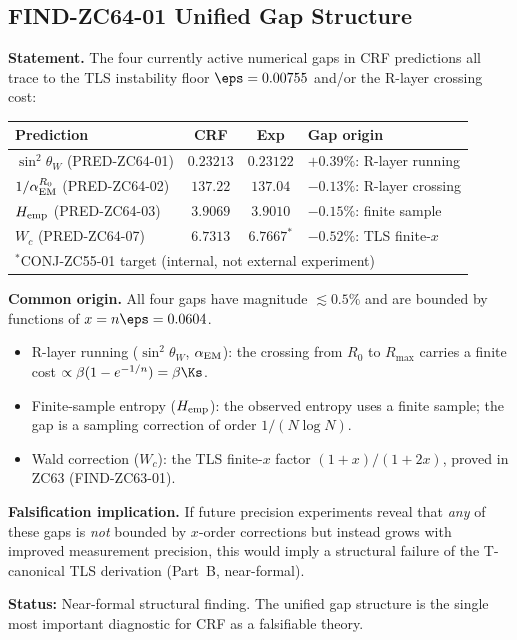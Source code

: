 \documentclass[12pt, a4paper]{article}
\renewcommand{\swsq}{\sin^2\!\theta_W}
\renewcommand{\aEM}{\alpha_{\rm EM}}
\begin{document}
\subsection{FIND-ZC64-01 \quad Unified Gap Structure}
\label{sec:find01}


\begin{derivedbox}[title={FIND-ZC64-01: All Active Gaps Share
  a Common Origin in $\eps$ ($R_0$)}]
\textbf{Statement.}
The four currently active numerical gaps in CRF predictions
all trace to the TLS instability floor $\eps = 0.00755$
and/or the R-layer crossing cost:

\medskip
\begin{center}
{\small\renewcommand{\arraystretch}{1.30}
\begin{tabular}{@{}lccl@{}}
\toprule
Prediction & CRF & Exp & Gap origin \\
\midrule
$\swsq$ (PRED-ZC64-01) & $0.23213$ & $0.23122$ & $+0.39\%$: R-layer running \\
$1/\aEM^{R_0}$ (PRED-ZC64-02) & $137.22$ & $137.04$ & $-0.13\%$: R-layer crossing \\
$H_{\rm emp}$ (PRED-ZC64-03) & $3.9069$ & $3.9010$ & $-0.15\%$: finite sample \\
$W_c$ (PRED-ZC64-07) & $6.7313$ & $6.7667^*$ & $-0.52\%$: TLS finite-$x$ \\
\bottomrule
\multicolumn{4}{l}{${}^*$CONJ-ZC55-01 target (internal, not external experiment)}
\end{tabular}
}
\end{center}

\medskip
\textbf{Common origin.}
All four gaps have magnitude $\lesssim 0.5\%$ and are bounded
by functions of $x = n\eps = 0.0604$.
\begin{itemize}[leftmargin=2em, noitemsep]
  \item R-layer running ($\swsq$, $\aEM$): the crossing
    from $R_0$ to $R_{\max}$ carries a finite cost
    $\propto \beta(1-e^{-1/n}) = \beta\Ks$.
  \item Finite-sample entropy ($H_{\rm emp}$): the observed
    entropy uses a finite sample; the gap is a sampling
    correction of order $1/(N\log N)$.
  \item Wald correction ($W_c$): the TLS finite-$x$ factor
    $(1+x)/(1+2x)$, proved in ZC63 (FIND-ZC63-01).
\end{itemize}

\textbf{Falsification implication.}
If future precision experiments reveal that \emph{any} of
these gaps is \emph{not} bounded by $x$-order corrections
but instead grows with improved measurement precision,
this would imply a structural failure of the T-canonical
TLS derivation (Part~B, near-formal).

\textbf{Status:} Near-formal structural finding.
The unified gap structure is the single most important
diagnostic for CRF as a falsifiable theory.
\end{derivedbox}
\end{document}
